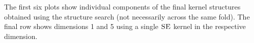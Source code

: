 \documentclass[a4paper,12pt ]{report}
\begin{document}
The first six plots show individual components of the final kernel structures obtained using the structure search (not necessarily across the same fold). The final row shows dimensions 1 and 5 using a single $\textsc{SE}$ kernel in the respective dimension. 


\begin{center}

\end{center}
\end{document}
